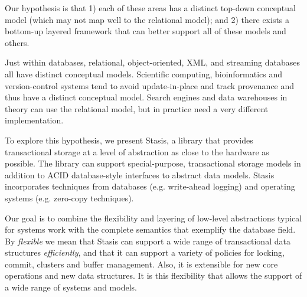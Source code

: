 \documentclass[letterpaper,twocolumn,10pt]{article}
\newcommand{\yad}{Stasis\xspace}
\newcommand{\eat}[1]{}
\begin{document}
Our hypothesis is that 1) each of these areas has a distinct top-down
conceptual model (which may not map well to the relational model); and
2) there exists a bottom-up layered framework that can better support all of these
models and others. 

Just within databases, relational, object-oriented, XML, and streaming
databases all have distinct conceptual models.  Scientific computing,
bioinformatics and version-control systems tend to avoid
update-in-place and track provenance and thus have a distinct
conceptual model.  Search engines and data warehouses in theory can
use the relational model, but in practice need a very different
implementation.



\eat{
Examples of real world systems that currently fall into this category
are web search engines, document repositories, large-scale web-email
services, map and trip planning services, ticket reservation systems,
photo and video repositories, bioinformatics, version control systems,
work-flow applications, CAD/VLSI applications and directory services.

In short, we believe that a fundamental architectural shift in
transactional storage is necessary before general-purpose storage
systems are of practical use to modern applications.
Until this change occurs, databases' imposition of unwanted
abstraction upon their users will restrict system designs and
implementations.
}

To explore this hypothesis, we present \yad, a library that provides transactional
storage at a level of abstraction as close to the hardware as
possible.  The library can support special-purpose, transactional
storage models in addition to ACID database-style interfaces to
abstract data models.  \yad incorporates techniques from databases
(e.g. write-ahead logging) and operating systems (e.g. zero-copy techniques).

Our goal is to combine the flexibility and layering of low-level
abstractions typical for systems work with the complete semantics
that exemplify the database field.
By {\em flexible} we mean that \yad{}  can support a wide
range of transactional data structures {\em efficiently}, and that it can support a variety
of policies for locking, commit, clusters and buffer management.
Also, it is extensible for new core operations
and new data structures. It is this flexibility that allows the
support of a wide range of systems and models.
\end{document}
